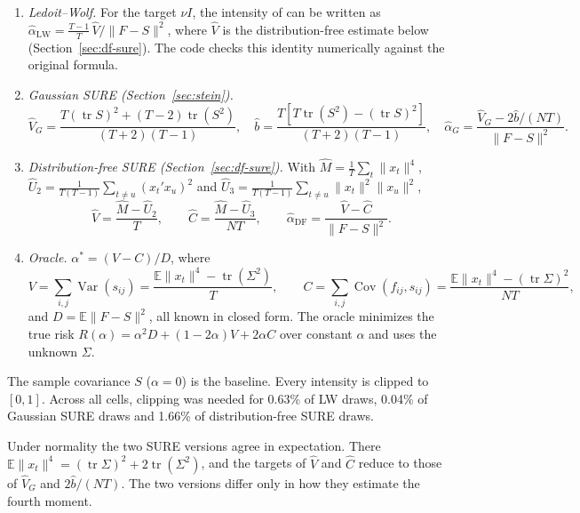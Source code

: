 \begin{enumerate}
  \item \emph{Ledoit--Wolf.} For the target $\nu I$, the intensity of \citet{ledoit2004} can be written as $\hat\alpha_{\mathrm{LW}} = \frac{T-1}{T}\, \hat V / \|F - S\|^2$, where $\hat V$ is the distribution-free estimate below (Section~\ref{sec:df-sure}). The code checks this identity numerically against the original formula.
  \item \emph{Gaussian SURE (Section~\ref{sec:stein}).}
  \[
    \hat V_G = \frac{T(\operatorname{tr}S)^2 + (T-2)\operatorname{tr}(S^2)}{(T+2)(T-1)}, \quad
    \hat b = \frac{T\left[ T\operatorname{tr}(S^2) - (\operatorname{tr}S)^2 \right]}{(T+2)(T-1)}, \quad
    \hat\alpha_G = \frac{\hat V_G - 2\hat b/(NT)}{\|F - S\|^2}.
  \]
  \item \emph{Distribution-free SURE (Section~\ref{sec:df-sure}).} With $\hat M = \frac{1}{T}\sum_t \|x_t\|^4$, $\hat U_2 = \frac{1}{T(T-1)}\sum_{t \ne u}(x_t'x_u)^2$ and $\hat U_3 = \frac{1}{T(T-1)}\sum_{t \ne u}\|x_t\|^2\|x_u\|^2$,
  \[
    \hat V = \frac{\hat M - \hat U_2}{T}, \qquad
    \hat C = \frac{\hat M - \hat U_3}{NT}, \qquad
    \hat\alpha_{\mathrm{DF}} = \frac{\hat V - \hat C}{\|F - S\|^2}.
  \]
  \item \emph{Oracle.} $\alpha^* = (V - C)/D$, where
  \[
    V = \sum_{i,j}\operatorname{Var}(s_{ij}) = \frac{\mathbb{E}\|x_t\|^4 - \operatorname{tr}(\Sigma^2)}{T}, \qquad
    C = \sum_{i,j}\operatorname{Cov}(f_{ij}, s_{ij}) = \frac{\mathbb{E}\|x_t\|^4 - (\operatorname{tr}\Sigma)^2}{NT},
  \]
  and $D = \mathbb{E}\|F - S\|^2$, all known in closed form. The oracle minimizes the true risk $R(\alpha) = \alpha^2 D + (1 - 2\alpha)V + 2\alpha C$ over constant $\alpha$ and uses the unknown $\Sigma$.
\end{enumerate}
The sample covariance $S$ ($\alpha = 0$) is the baseline. Every intensity is clipped to $[0, 1]$. Across all cells, clipping was needed for 0.63\% of LW draws, 0.04\% of Gaussian SURE draws and 1.66\% of distribution-free SURE draws.

Under normality the two SURE versions agree in expectation. There $\mathbb{E}\|x_t\|^4 = (\operatorname{tr}\Sigma)^2 + 2\operatorname{tr}(\Sigma^2)$, and the targets of $\hat V$ and $\hat C$ reduce to those of $\hat V_G$ and $2\hat b/(NT)$. The two versions differ only in how they estimate the fourth moment.


